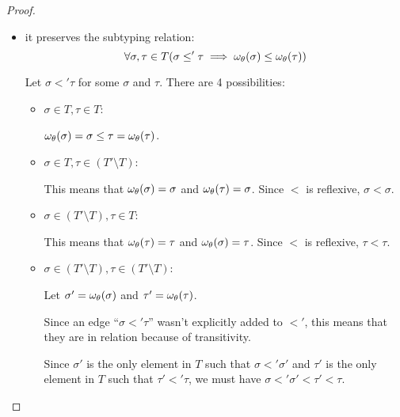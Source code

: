 \documentclass[main.tex]{subfiles}
\begin{document}
\begin{proof}
\begin{itemize}
        \item it preserves the subtyping relation:
            \[ \forall \sigma, \tau \in T (\sigma \leq' \tau \implies
                \omega_{\theta}(\sigma) \leq \omega_{\theta}(\tau)) \]

            Let $\sigma \less' \tau$ for some $\sigma$ and $\tau$.
            There are 4 possibilities:
            \begin{itemize}
                \item $\sigma \in T, \tau \in T$:

                    $\omega_{\theta}(\sigma) = \sigma \leq \tau = \omega_{\theta}(\tau)$.
                \item $\sigma \in T, \tau \in (T' \setminus T)$:

                    This means that $\omega_{\theta}(\sigma) = \sigma$
                    and $\omega_{\theta}(\tau) = \sigma$. Since $\less$ is
                    reflexive, $\sigma \less \sigma$.
                \item $\sigma \in (T' \setminus T), \tau \in T$:

                    This means that $\omega_{\theta}(\tau) = \tau$
                    and $\omega_{\theta}(\sigma) = \tau$. Since $\less$ is
                    reflexive, $\tau \less \tau$.
                \item $\sigma \in (T' \setminus T), \tau \in (T' \setminus T)$:

                    Let $\sigma' = \omega_{\theta}(\sigma)$
                    and $\tau' = \omega_{\theta}(\tau)$.

                    Since an edge ``$\sigma \less' \tau$''
                    wasn't explicitly added to $\less'$, this means that they
                    are in relation because of transitivity.

                    Since $\sigma'$ is the only element in $T$ such that
                    $\sigma \less' \sigma'$ and $\tau'$ is the only element in $T$
                    such that $\tau' \less' \tau$, we must have
                    $\sigma \less' \sigma' \less \tau' \less \tau$.
            \end{itemize}
    \end{itemize}
\end{proof}
\end{document}
